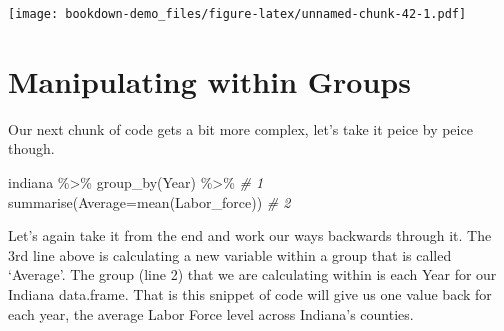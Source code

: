 \documentclass[
]{book}
\newenvironment{Shaded}{\begin{snugshade}}{\end{snugshade}}
\newcommand{\AttributeTok}[1]{\textcolor[rgb]{0.77,0.63,0.00}{#1}}
\newcommand{\CommentTok}[1]{\textcolor[rgb]{0.56,0.35,0.01}{\textit{#1}}}
\newcommand{\FunctionTok}[1]{\textcolor[rgb]{0.00,0.00,0.00}{#1}}
\newcommand{\NormalTok}[1]{#1}
\newcommand{\SpecialCharTok}[1]{\textcolor[rgb]{0.00,0.00,0.00}{#1}}
\begin{document}
\texttt{[image: bookdown-demo\_files/figure-latex/unnamed-chunk-42-1.pdf]}

\hypertarget{manipulating-within-groups}{%
\section{Manipulating within Groups}\label{manipulating-within-groups}}

Our next chunk of code gets a bit more complex, let's take it peice by peice though.

\begin{Shaded}
\begin{Highlighting}[]
\NormalTok{  indiana }\SpecialCharTok{\%\textgreater{}\%} \FunctionTok{group\_by}\NormalTok{(Year) }\SpecialCharTok{\%\textgreater{}\%}          \CommentTok{\# 1}
    \FunctionTok{summarise}\NormalTok{(}\AttributeTok{Average=}\FunctionTok{mean}\NormalTok{(Labor\_force))  }\CommentTok{\# 2}
\end{Highlighting}
\end{Shaded}

Let's again take it from the end and work our ways backwards through it. The 3rd line above is calculating a new variable within a group that is called `Average'. The group (line 2) that we are calculating within is each Year for our Indiana data.frame. That is this snippet of code will give us one value back for each year, the average Labor Force level across Indiana's counties.
\end{document}
